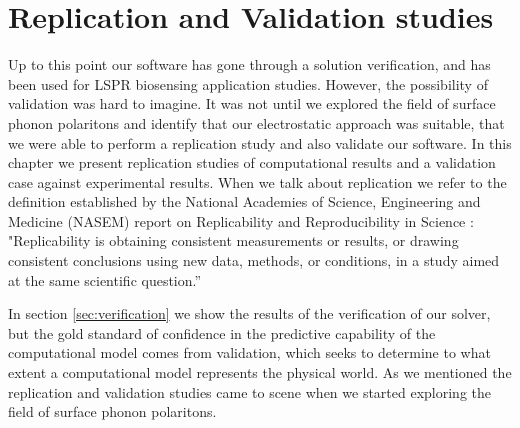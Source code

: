 
\chapter{Replication and Validation studies}

Up to this point our software \pygbe has gone through a solution verification, and has been used for 
LSPR biosensing application studies. However, the possibility of validation was hard to imagine. It was not
until we explored the field of surface phonon polaritons and identify that our electrostatic approach was suitable, 
that we were able to perform a replication study and also validate our software. In this chapter we present replication 
studies of computational results and a validation case against experimental results.
When we talk about replication we refer to the definition established by the National Academies of Science, Engineering 
and Medicine (NASEM) report on Replicability and Reproducibility in Science \cite{NASEM2019}: "Replicability is obtaining 
consistent measurements or results, or drawing consistent conclusions using new data, methods, or conditions, in a
study aimed at the same scientific question.” 

In section \ref{sec:verification} we show the results of the verification of our solver, but the gold standard of confidence 
in the predictive capability of the computational model comes from validation, which seeks to determine to what extent a
computational model represents the physical world. As we mentioned the replication and validation studies came to scene 
when we started exploring the field of surface phonon polaritons. 

